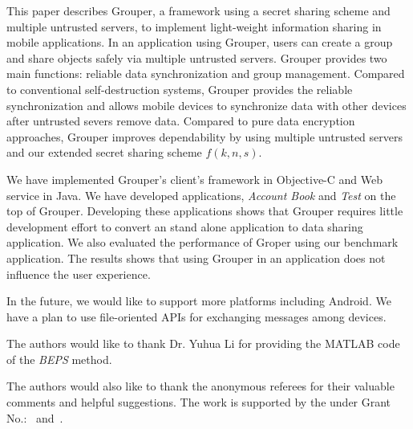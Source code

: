 This paper describes Grouper, a framework using a secret sharing scheme and multiple untrusted servers, to implement light-weight information sharing in mobile applications.
In an application using Grouper, users can create a group and share objects safely via multiple untrusted servers.
Grouper provides two main functions: reliable data synchronization and group management.
Compared to conventional self-destruction systems, Grouper provides the reliable synchronization and allows mobile devices to synchronize data with other devices after untrusted severs remove data.
Compared to pure data encryption approaches, Grouper improves dependability by using multiple untrusted servers and our extended secret sharing scheme $f(k, n, s)$.

We have implemented Grouper's client's framework in Objective-C and Web service in Java. 
We have developed applications, \emph{Account Book} and \emph{Test} on the top of Grouper.
Developing these applications shows that Grouper requires little development effort to convert an stand alone application to data sharing application.
We also evaluated the performance of Groper using our benchmark application.
The results shows that using Grouper in an application does not influence the user experience.

In the future, we would like to support more platforms including Android.
We have a plan to use file-oriented APIs for exchanging messages among devices.

\begin{acks}
  The authors would like to thank Dr. Yuhua Li for providing the
  MATLAB code of the \textit{BEPS} method.

  The authors would also like to thank the anonymous referees for
  their valuable comments and helpful suggestions. The work is
  supported by the  under Grant
  No.:~
  and~.

\end{acks}
